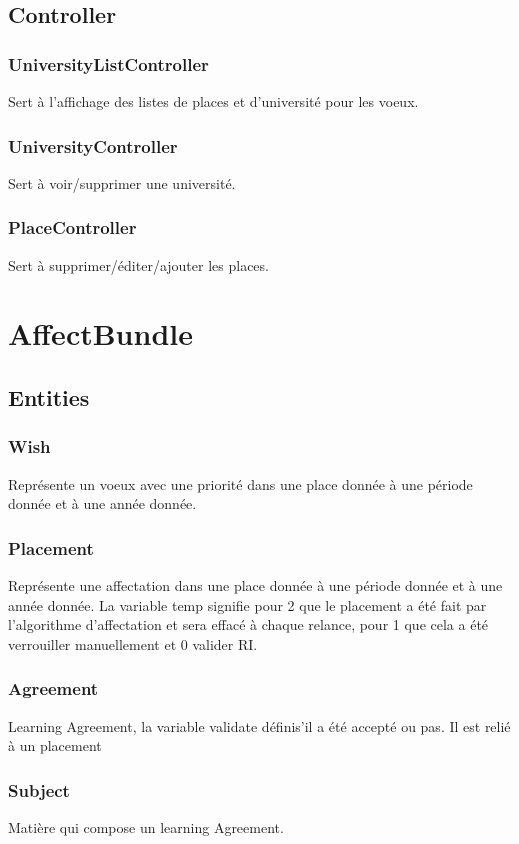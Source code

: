 \subsection{Controller}
\subsubsection{UniversityListController}
Sert à l'affichage des listes de places et d'université pour les voeux.

\subsubsection{UniversityController}
Sert à voir/supprimer une université. 

\subsubsection{PlaceController}
Sert à supprimer/éditer/ajouter les places.


\section{AffectBundle}
\subsection{Entities}
\subsubsection{Wish}
Représente un voeux avec une priorité dans une place donnée à une période donnée et à une année donnée.

\subsubsection{Placement}
Représente une affectation dans une place donnée à une période donnée et à une année donnée. La variable temp signifie pour 2 que le placement a été fait par l'algorithme d'affectation et sera effacé à chaque relance, pour 1 que cela a été verrouiller manuellement et 0 valider RI.

\subsubsection{Agreement}
Learning Agreement, la variable validate définis'il a été accepté ou pas. Il est relié à un placement

\subsubsection{Subject}
Matière qui compose un learning Agreement.

